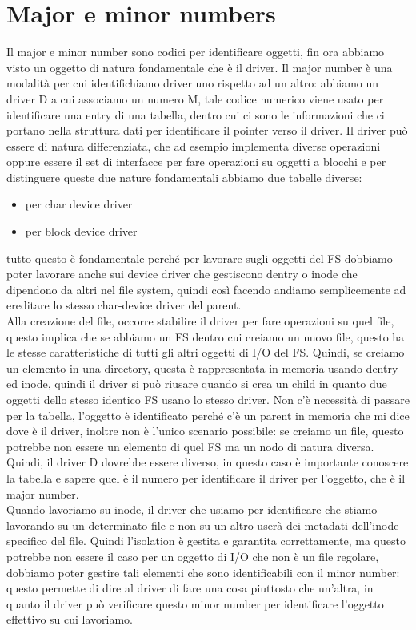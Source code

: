 \documentclass[12pt, oneside]{extbook}
\begin{document}
\section{Major e minor numbers}
Il major e minor number sono codici per identificare oggetti, fin ora abbiamo visto un oggetto di natura fondamentale che è il driver. Il major number è una modalità per cui identifichiamo driver uno rispetto ad un altro: abbiamo un driver D a cui associamo un numero M, tale codice numerico viene usato per identificare una entry di una tabella, dentro cui ci sono le informazioni che ci portano nella struttura dati per identificare il pointer verso il driver. Il driver può essere di natura differenziata, che ad esempio implementa diverse operazioni oppure essere il set di interfacce per fare operazioni su oggetti a blocchi e per distinguere queste due nature fondamentali abbiamo due tabelle diverse:
\begin{itemize}
\item per char device driver
\item per block device driver 
\end{itemize}
tutto questo è fondamentale perché per lavorare sugli oggetti del FS dobbiamo poter lavorare anche sui device driver che gestiscono dentry o inode che dipendono da altri nel file system, quindi così facendo andiamo semplicemente ad ereditare lo stesso char-device driver del parent.\\Alla creazione del file, occorre stabilire il driver per fare operazioni su quel file, questo implica che se abbiamo un FS dentro cui creiamo un nuovo file, questo ha le stesse caratteristiche di tutti gli altri oggetti di I/O del FS. Quindi, se creiamo un elemento in una directory, questa è rappresentata in memoria usando dentry ed inode, quindi il driver si può riusare quando si crea un child in quanto due oggetti dello stesso identico FS usano lo stesso driver. Non c'è necessità di passare per la tabella, l'oggetto è identificato perché c'è un parent in memoria che mi dice dove è il driver, inoltre non è l'unico scenario possibile: se creiamo un file, questo potrebbe non essere un elemento di quel FS ma un nodo di natura diversa. Quindi, il driver D dovrebbe essere diverso, in questo caso è importante conoscere la tabella e sapere quel è il numero per identificare il driver per l'oggetto, che è il major number.\\Quando lavoriamo su inode, il driver che usiamo per identificare che stiamo lavorando su un determinato file e non su un altro userà dei metadati dell'inode specifico del file. Quindi l'isolation è gestita e garantita correttamente, ma questo potrebbe non essere il caso per un oggetto di I/O che non è un file regolare, dobbiamo poter gestire tali elementi che sono identificabili con il minor number: questo permette di dire al driver di fare una cosa piuttosto che un'altra, in quanto il driver può verificare questo minor number per identificare l'oggetto effettivo su cui lavoriamo.
\end{document}
